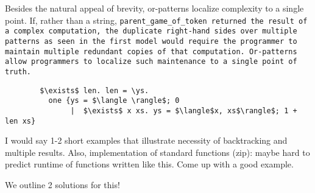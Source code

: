 \documentclass[manuscript,screen,review, 12pt]{acmart}
\begin{document}
    Besides the natural appeal of brevity, or-patterns localize complexity to a
    single point. If, rather than a string, \tt{parent\_game\_of\_token}
    returned the result of a complex computation, the duplicate right-hand sides
    over multiple patterns as seen in the first model would require the
    programmer to maintain multiple redundant copies of that computation.
     Or-patterns allow programmers to
    localize such maintenance to a single point of truth. 

\verselst
    \begin{lstlisting}
        $\exists$ len. len = \ys. 
          one {ys = $\langle \rangle$; 0
               |  $\exists$ x xs. ys = $\langle$x, xs$\rangle$; 1 + len xs}
    \end{lstlisting}


    I would say 1-2 short examples that illustrate necessity of backtracking 
    and multiple results. Also, implementation of standard functions (zip): 
    maybe hard to predict runtime of functions written like this. Come up with 
    a good example. 

    We outline 2 solutions for this! 
\end{document}
